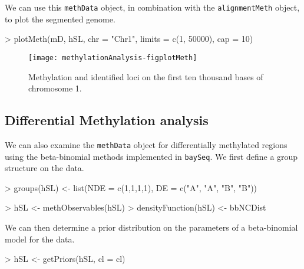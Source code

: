 \documentclass[a4paper]{article}
\begin{document}
We can use this \verb'methData' object, in combination with the \verb'alignmentMeth' object, to plot the segmented genome.

\begin{Schunk}
\begin{Sinput}
> plotMeth(mD, hSL, chr = "Chr1", limits = c(1, 50000), cap = 10)
\end{Sinput}
\end{Schunk}

\begin{figure}[!ht]
\begin{center}
\texttt{[image: methylationAnalysis-figplotMeth]}
\caption{Methylation and identified loci on the first ten thousand bases of chromosome 1.}
\label{fig:plotMeth}
\end{center}
\end{figure}



\subsection*{Differential Methylation analysis}

We can also examine the \verb'methData' object for differentially methylated regions using the beta-binomial methods \cite{Hardcastle:2013} implemented in \verb'baySeq'. We first define a group structure on the data.

\begin{Schunk}
\begin{Sinput}
> groups(hSL) <- list(NDE = c(1,1,1,1), DE = c("A", "A", "B", "B"))
\end{Sinput}
\end{Schunk}

\begin{Schunk}
\begin{Sinput}
> hSL <- methObservables(hSL)
> densityFunction(hSL) <- bbNCDist
\end{Sinput}
\end{Schunk}

We can then determine a prior distribution on the parameters of a beta-binomial model for the data.

\begin{Schunk}
\begin{Sinput}
> hSL <- getPriors(hSL, cl = cl)
\end{Sinput}
\end{Schunk}
\end{document}
